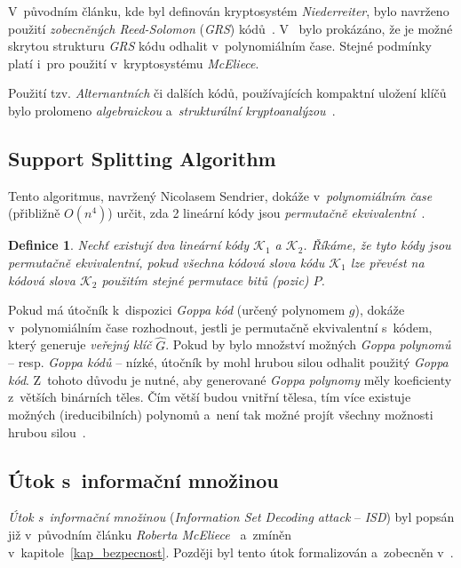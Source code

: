 \documentclass[thesis=M,czech,hidelinks]{FITthesis}[2012/06/26]
\newcommand{\0}{{\textcolor[gray]{0.75}{0}}}
\newtheorem{definice}{Definice}
\begin{document}
V~původním článku, kde byl definován kryptosystém \emph{Niederreiter}, bylo
navrženo použití \emph{zobecněných Reed-Solomon} (\emph{GRS})
kódů~\cite{Niederreiter}. V~\cite{Sidelnikov} bylo prokázáno, že je možné
skrytou strukturu \emph{GRS} kódu odhalit v~polynomiálním čase. Stejné podmínky
platí i~pro použití v~kryptosystému \emph{McEliece}.

Použití tzv. \emph{Alternantních} či dalších kódů, používajících kompaktní
uložení klíčů bylo prolomeno \emph{algebraickou} a~\emph{strukturální
kryptoanalýzou}~\cite{Faugere1,Faugere2,Umana}.


\subsection{Support Splitting Algorithm}

Tento algoritmus, navržený Nicolasem Sendrier, dokáže v~\emph{polynomiálním
čase} (přibližně $O(n^4)$) určit, zda 2 lineární kódy jsou \emph{permutačně
ekvivalentní}~\cite{Sendrier}.

\begin{definice}
    Nechť existují dva lineární kódy $\mathcal{K}_1$ a $\mathcal{K}_2$. Říkáme,
    že tyto kódy jsou \emph{permutačně ekvivalentní}, pokud všechna kódová slova
    kódu $\mathcal{K}_1$ lze převést na kódová slova $\mathcal{K}_2$ použitím
    stejné permutace bitů (pozic) $P$.
\end{definice}

Pokud má útočník k~dispozici \emph{Goppa kód} (určený polynomem $g$), dokáže
v~polynomiálním čase rozhodnout, jestli je permutačně ekvivalentní s~kódem,
který generuje \emph{veřejný klíč} $\hat{G}$. Pokud by bylo množství možných
\emph{Goppa polynomů} -- resp. \emph{Goppa kódů} -- nízké, útočník by mohl
hrubou silou odhalit použitý \emph{Goppa kód}. Z~tohoto důvodu je nutné, aby
generované \emph{Goppa polynomy} měly koeficienty z~větších binárních těles. Čím
větší budou vnitřní tělesa, tím více existuje možných (ireducibilních) polynomů
a~není tak možné projít všechny možnosti hrubou silou~\cite{Repka}.


\subsection{Útok s~informační množinou}

\emph{Útok s~informační množinou} (\emph{Information Set Decoding attack} --
\emph{ISD}) byl popsán již v~původním článku \emph{Roberta
McEliece}~\cite{McEliece} a~zmíněn v~kapitole~\ref{kap_bezpecnost}. Později byl
tento útok formalizován a~zobecněn v~\cite{Lee}.
\end{document}
